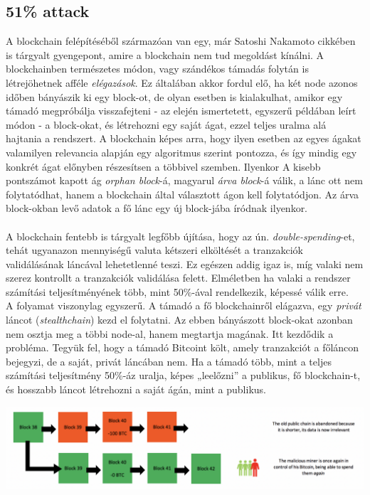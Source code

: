 \documentclass[11pt,a4paper]{article}
\newcommand{\q}[1]{„#1''} %
\begin{document}
\subsection{51\% attack}
A blockchain felépítéséből származóan van egy, már Satoshi Nakamoto cikkében is tárgyalt gyengepont, amire a blockchain nem tud megoldást kínálni. A blockchainben természetes módon, vagy szándékos támadás folytán is létrejöhetnek afféle \textit{elégazások}. Ez általában akkor fordul elő, ha két node azonos időben bányászik ki egy block-ot, de olyan esetben is kialakulhat, amikor egy támadó megpróbálja visszafejteni - az elején ismertetett, egyszerű példában leírt módon - a block-okat, és létrehozni egy saját ágat, ezzel teljes uralma alá hajtania a rendszert. A blockchain képes arra, hogy ilyen esetben az egyes ágakat valamilyen relevancia alapján egy algoritmus szerint pontozza, és így mindig egy konkrét ágat előnyben részesítsen a többivel szemben. Ilyenkor A kisebb pontszámot kapott ág \textit{orphan block}-á, magyarul \textit{árva block}-á válik, a lánc ott nem folytatódhat, hanem a blockchain által választott ágon kell folytatódjon. Az árva block-okban levő adatok a fő lánc egy új block-jába íródnak ilyenkor.
\\ \\
A blockchain fentebb is tárgyalt legfőbb újítása, hogy az ún. \textit{double-spending}-et, tehát ugyanazon mennyiségű valuta kétszeri elköltését a tranzakciók validálásának láncával lehetetlenné teszi. Ez egészen addig igaz is, míg valaki nem szerez kontrollt a tranzakciók validálása felett. Elméletben ha valaki a rendszer számítási teljesítményének több, mint 50\%-ával rendelkezik, képessé válik erre. \\
A folyamat viszonylag egyszerű. A támadó a fő blockchainről elágazva, egy \textit{privát} láncot (\textit{stealthchain}) kezd el folytatni. Az ebben bányászott block-okat azonban nem osztja meg a többi node-al, hanem megtartja magának. Itt kezdődik a probléma. Tegyük fel, hogy a támadó Bitcoint költ, amely tranzakciót a főláncon bejegyzi, de a saját, privát láncában nem. Ha a támadó több, mint a teljes számítási teljesítmény 50\%-áz uralja, képes \q{leelőzni} a publikus, fő blockchain-t, és hosszabb láncot létrehozni a saját ágán, mint a publikus. 

\begin{center}
\includegraphics[width=\textwidth]{stealthchain.png}
\end{center}
\end{document}
